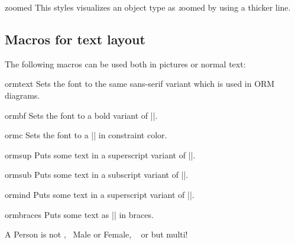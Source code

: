 \documentclass[a4paper,10pt]{article}
\begin{document}

\begin{stylekey}{zoomed}
This styles visualizes an object type as {\emph zoomed} by using a thicker line.
\begin{codeexample}[]
\end{codeexample}
\end{stylekey}

\subsection{Macros for text layout} 
\label{sec:ormtext}
The following macros can be used both in \tikzname{} pictures or normal text:

\begin{command}{ormtext}
Sets the font to the same sans-serif variant which is used in ORM diagrams.
\end{command}

\begin{command}{ormbf}
Sets the font to a bold variant of |\ormtext|.
\end{command}

\begin{command}{ormc}
Sets the font to a |\ormtext| in constraint color.
\end{command}

\begin{command}{ormsup}
Puts some text in a superscript variant of |\ormtext|.
\end{command}

\begin{command}{ormsub}
Puts some text in a subscript variant of |\ormtext|.
\end{command}

\begin{command}{ormind}
Puts some text in a superscript variant of |\ormbf|.
\end{command}

\begin{command}{ormbraces}
Puts some text as |\ormtext| in braces.
\end{command}

\begin{codeexample}[]
A {\ormtext Person} is not ,~
{\ormc Male} {\ormbf or} {\ormtext Female}, ~
{\ormbf or}  but multi!
\end{codeexample}
\end{document}
